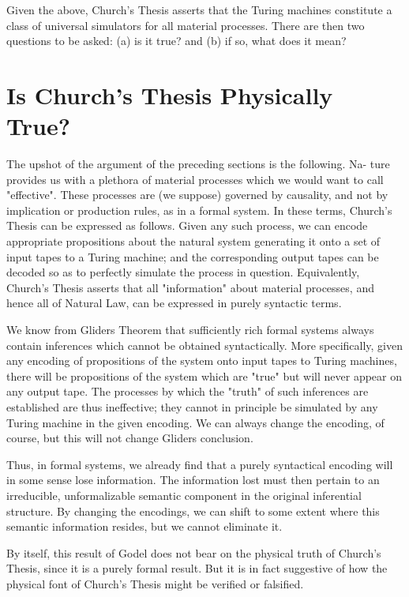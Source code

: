 \documentclass[a4paper,12pt]{article}
\begin{document}
Given the above, Church's Thesis asserts that the Turing machines constitute
a class of universal simulators for all material processes. There are
then two questions to be asked: (a) is it true? and (b) if so, what does it
mean?

\section{Is Church's Thesis Physically True?}

The upshot of the argument of the preceding sections is the following. Na-
ture provides us with a plethora of material processes which we would want
to call "effective". These processes are (we suppose) governed by causality,
and not by implication or production rules, as in a formal system. In these
terms, Church's Thesis can be expressed as follows. Given any such process,
we can encode appropriate propositions about the natural system generating
it onto a set of input tapes to a Turing machine; and the corresponding output
tapes can be decoded so as to perfectly simulate the process in question.
Equivalently, Church's Thesis asserts that all "information" about material
processes, and hence all of Natural Law, can be expressed in purely syntactic
terms.

We know from Gliders Theorem that sufficiently rich formal systems
always contain inferences which cannot be obtained syntactically.  More
specifically, given any encoding of propositions of the system onto input
tapes to Turing machines, there will be propositions of the system which are
"true" but will never appear on any output tape. The processes by which the
"truth" of such inferences are established are thus ineffective; they cannot
in principle be simulated by any Turing machine in the given encoding. We
can always change the encoding, of course, but this will not change Gliders
conclusion.

Thus, in formal systems, we already find that a purely syntactical encoding
will in some sense lose information. The information lost must then
pertain to an irreducible, unformalizable semantic component in the original
inferential structure. By changing the encodings, we can shift to some
extent where this semantic information resides, but we cannot eliminate it.

By itself, this result of Godel does not bear on the physical truth of
Church's Thesis, since it is a purely formal result. But it is in fact suggestive
of how the physical font of Church's Thesis might be verified or falsified.
\end{document}
